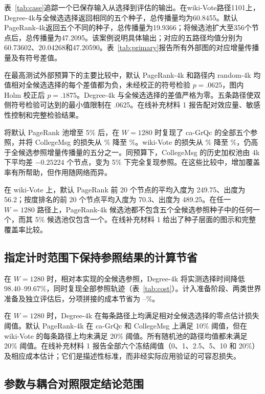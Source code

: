 \documentclass[smallextended]{svjour3}
\begin{document}
表~\ref{tab:case}追踪一个已保存输入从选择到评估的输出。在wiki-Vote路径1101上，Degree-4k与全候选选择返回相同的五个种子，总传播量均为60.8455。默认PageRank-4k返回五个不同的种子，总传播量为19.9366；将候选池扩大至356个节点后，总传播量为47.2095。该案例说明具体输出；对应的五路径均值分别为60.73602、20.04268和47.20590。表~\ref{tab:primary}报告所有外部图的对应增量传播量及有符号差值。




在最高测试外部预算下的主要比较中，默认 PageRank-4k 和路径内 random-4k 均值相对全候选选择的每个差值都为负，未经校正的符号检验 $p=.0625$，图内 Holm 校正后 $p=.1875$。Degree-4k 与全候选选择的差值严格为零。五条路径使双侧符号检验可达到的最小值限制在 .0625。在线补充材料 1 报告配对效应量、敏感性控制和完整检验结果。

将默认 PageRank 池增至 5\% 后，在 $W=1280$ 时复现了 ca-GrQc 的全部五个参照，并将 CollegeMsg 的损失从 \CollegePRLoss{}\% 降至 \CollegePRfiveLoss{}\%。wiki-Vote 的损失从 \WikiPRLoss{}\% 降至 \WikiPRfiveLoss{}\%，仍高于全候选参照增量传播量的五分之一。同预算下，CollegeMsg 的历史加权池由 4k 下平均差 $-0.25224$ 个节点，变为 5\% 下完全复现参照。在这些比较中，增加覆盖率有所帮助，但作用随网络而异。

在 wiki-Vote 上，默认 PageRank 前 20 个节点的平均入度为 249.75、出度为 56.2；按度排名的前 20 个节点平均入度为 70.3、出度为 489.25。在任一 $W=1280$ 路径上，PageRank-4k 候选池都不包含五个全候选参照种子中的任何一个，而其 5\% 候选池仅包含一个。在线补充材料 1 给出了种子层面的图示和完整覆盖率比较。

\subsection{指定计时范围下保持参照结果的计算节省}
在 $W=1280$ 时，相对本实现的全候选参照，Degree-4k 将实测选择时间降低 98.40--99.67\%，同时复现全部参照轨迹（表~\ref{tab:cost}）。计入准备阶段、两类世界准备及独立评估后，分项拼接的成本节省为 \CollegeDegreeSaving{}--\WikiDegreeSaving{}\%。


在 $W=1280$ 时，Degree-4k 在每条路径上均满足相对全候选选择的零点估计损失阈值。默认 PageRank-4k 在 ca-GrQc 和 CollegeMsg 上满足 10\% 阈值，但在 wiki-Vote 的每条路径上均未满足 20\% 阈值。所有随机池的路径均值都未满足 20\% 阈值。在线补充材料 1 报告全部六个冻结阈值（0、1、2.5、5、10 和 20\%）及相应成本估计；它们是描述性标准，而非经实际应用验证的可容忍损失。

\subsection{参数与耦合对照限定结论范围}
\end{document}
